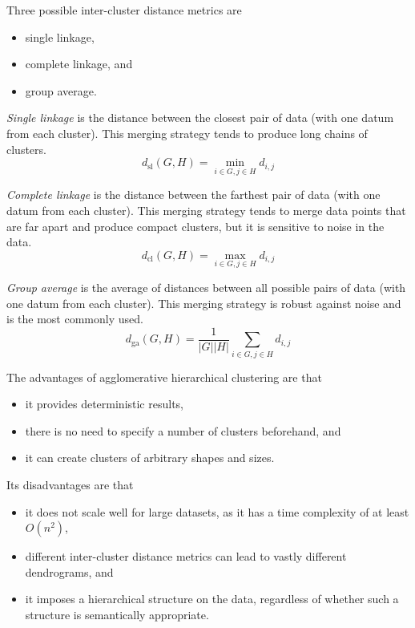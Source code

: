 Three possible inter-cluster distance metrics are
\begin{itemize}
  \item single linkage,
  \item complete linkage, and
  \item group average.
\end{itemize}

\emph{Single linkage} is the distance between the closest pair of data (with one datum from each cluster).
This merging strategy tends to produce long chains of clusters.
\begin{equation*}
  d_{\text{sl}}\!\left( G, H \right) = \min_{i \in G, j \in H} d_{i,j}
\end{equation*}

\emph{Complete linkage} is the distance between the farthest pair of data (with one datum from each cluster).
This merging strategy tends to merge data points that are far apart and produce compact clusters, but it is sensitive to noise in the data.
\begin{equation*}
  d_{\text{cl}}\!\left( G, H \right) = \max_{i \in G, j \in H} d_{i,j}
\end{equation*}

\emph{Group average} is the average of distances between all possible pairs of data (with one datum from each cluster).
This merging strategy is robust against noise and is the most commonly used.
\begin{equation*}
  d_{\text{ga}}\!\left( G, H \right) = \frac{1}{\left\lvert G \right\rvert \left\lvert H \right\rvert} \sum_{i \in G, j \in H} d_{i,j}
\end{equation*}

The advantages of agglomerative hierarchical clustering are that
\begin{itemize}
  \item it provides deterministic results,
  \item there is no need to specify a number of clusters beforehand, and
  \item it can create clusters of arbitrary shapes and sizes.
\end{itemize}
Its disadvantages are that
\begin{itemize}
  \item it does not scale well for large datasets, as it has a time complexity of at least \( O\!\left( n^{2} \right) \),
  \item different inter-cluster distance metrics can lead to vastly different dendrograms, and
  \item it imposes a hierarchical structure on the data, regardless of whether such a structure is semantically appropriate.
\end{itemize}

